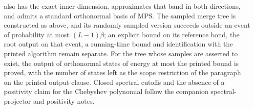 \documentclass{article}
\begin{document}
also has the exact inner dimension,
approximates that band in both directions, and admits a standard
orthonormal basis of MPS. The sampled merge tree is constructed as above,
and its randomly sampled version succeeds outside an event of probability
at most $(L-1)\beta$; an explicit bound on its reference bond, the root
output on that event, a running-time bound and identification with the
printed algorithm remain separate. For the tree whose samples are asserted to
exist, the output of orthonormal states of energy at most the printed bound
is proved, with the number of states left as the scope restriction of the
paragraph on the printed output clause. Closed spectral
cutoffs and the absence of a positivity claim for the Chebyshev polynomial
follow the companion spectral-projector and positivity notes.



\end{document}
